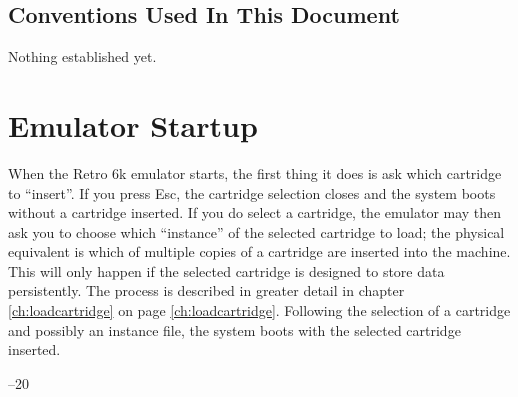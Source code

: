 \documentclass[12pt]{{memoir}}
\begin{document}
\vspace*{3in}
\section*{Conventions Used In This Document}

Nothing established yet.

\chapter{Emulator Startup}

When the Retro 6k emulator starts, the first thing it does is ask which cartridge to ``insert''. If you press \textsf{Esc}, the cartridge selection closes and the system boots without a cartridge inserted. If you do select a cartridge, the emulator may then ask you to choose which ``instance'' of the selected cartridge to load; the physical equivalent is which of multiple copies of a cartridge are inserted into the machine. This will only happen if the selected cartridge is designed to store data persistently. The process is described in greater detail in chapter \ref{ch:loadcartridge} on page \ref{ch:loadcartridge}. Following the selection of a cartridge and possibly an instance file, the system boots with the selected cartridge inserted.

\cleartoverso
\pagestyle{empty}

\noindent\thetitle\hfill{}--20 \theauthor
\end{document}
